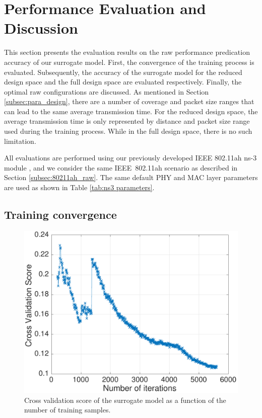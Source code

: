 \section{Performance Evaluation and Discussion \label{sec:evaluation}}

This section presents the evaluation results on the \gls{raw} performance predication accuracy of our surrogate model. First, the  convergence of the training process is evaluated. Subsequently, the accuracy of the surrogate model for the reduced design space and the full design space are evaluated respectively. Finally, the optimal \gls{raw} configurations are discussed. As mentioned in Section \ref{subsec:para_design}, there are a number of coverage and packet size ranges that can lead to the same average transmission time. For the reduced design space, the average transmission time is only represented by distance and packet size range used during the training process. While in the full design space, there is no such limitation.

All evaluations are performed using our previously developed
IEEE 802.11ah ns-3 module \cite{WNS32016}, and we consider the same IEEE~802.11ah scenario as described in Section \ref{subsec:80211ah_raw}. The same default PHY and MAC layer parameters are used as shown in Table \ref{tab:ns3 parameters}.


\subsection{Training convergence}
\begin{figure}[t]
  \centering
  \includegraphics[width=0.75\columnwidth]{figures/throughput-cv}
  \caption{Cross validation score of the surrogate model as a function of the number of training samples. \label{fig:sumo-iteraton}}
\end{figure}

